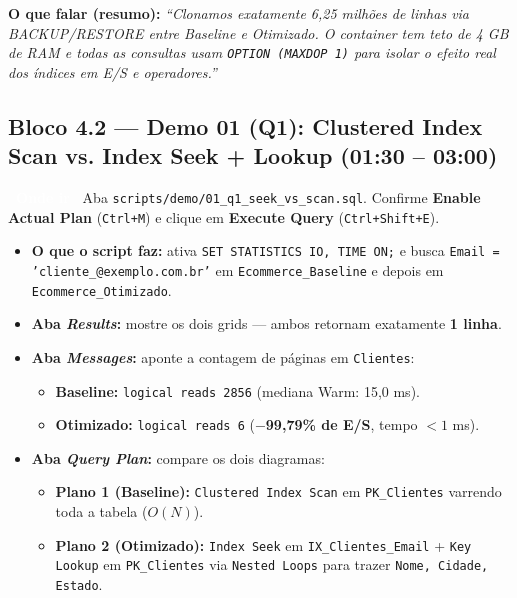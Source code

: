 \documentclass[10pt,a4paper]{article}
\newcommand{\tagAction}[1]{\colorbox{InfoBlue}{\textcolor{white}{\textbf{\footnotesize\ #1\ }}}}
\begin{document}
\textbf{O que falar (resumo):} \emph{``Clonamos exatamente 6,25 milhões de linhas via BACKUP/RESTORE entre Baseline e Otimizado. O container tem teto de 4 GB de RAM e todas as consultas usam \texttt{OPTION (MAXDOP 1)} para isolar o efeito real dos índices em E/S e operadores.''}

\subsection*{Bloco 4.2 — Demo 01 (Q1): Clustered Index Scan vs. Index Seek + Lookup (01:30 -- 03:00)}
\tagAction{Onde ir} Aba \texttt{scripts/demo/01\_q1\_seek\_vs\_scan.sql}. Confirme \textbf{Enable Actual Plan} (\texttt{Ctrl+M}) e clique em \textbf{Execute Query} (\texttt{Ctrl+Shift+E}).

\begin{itemize}[leftmargin=14pt,itemsep=1.5pt,topsep=2pt]
  \item \textbf{O que o script faz:} ativa \texttt{SET STATISTICS IO, TIME ON;} e busca \texttt{Email = 'cliente\_@exemplo.com.br'} em \texttt{Ecommerce\_Baseline} e depois em \texttt{Ecommerce\_Otimizado}.
  \item \textbf{Aba \emph{Results}:} mostre os dois grids — ambos retornam exatamente \textbf{1 linha}.
  \item \textbf{Aba \emph{Messages}:} aponte a contagem de páginas em \texttt{Clientes}:
  \begin{itemize}[leftmargin=14pt,itemsep=1pt,topsep=1pt]
    \item \textbf{Baseline:} \texttt{logical reads 2856} (mediana Warm: 15,0 ms).
    \item \textbf{Otimizado:} \texttt{logical reads 6} (\textbf{$-$99,79\% de E/S}, tempo $<1$ ms).
  \end{itemize}
  \item \textbf{Aba \emph{Query Plan}:} compare os dois diagramas:
  \begin{itemize}[leftmargin=14pt,itemsep=1pt,topsep=1pt]
    \item \textbf{Plano 1 (Baseline):} \texttt{Clustered Index Scan} em \texttt{PK\_Clientes} varrendo toda a tabela ($O(N)$).
    \item \textbf{Plano 2 (Otimizado):} \texttt{Index Seek} em \texttt{IX\_Clientes\_Email} + \texttt{Key Lookup} em \texttt{PK\_Clientes} via \texttt{Nested Loops} para trazer \texttt{Nome, Cidade, Estado}.
  \end{itemize}
\end{itemize}
\end{document}
